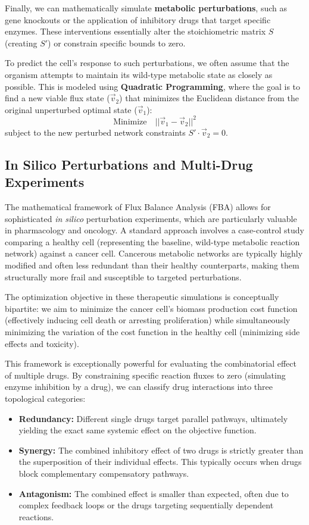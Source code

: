Finally, we can mathematically simulate \textbf{metabolic perturbations}, such as gene knockouts or the application of inhibitory drugs that target specific enzymes. These interventions essentially alter the stoichiometric matrix \(S\) (creating \(S'\)) or constrain specific bounds to zero.

To predict the cell's response to such perturbations, we often assume that the organism attempts to maintain its wild-type metabolic state as closely as possible. This is modeled using \textbf{Quadratic Programming}, where the goal is to find a new viable flux state (\(\vec{v}_2\)) that minimizes the Euclidean distance from the original unperturbed optimal state (\(\vec{v}_1\)):
\[
    \text{Minimize} \quad ||\vec{v}_1 - \vec{v}_2||^2
\]
subject to the new perturbed network constraints \(S' \cdot \vec{v}_2 = 0\).

\subsection{In Silico Perturbations and Multi-Drug Experiments}
\label{subsec:multidrug_insilico}

The mathematical framework of Flux Balance Analysis (FBA) allows for sophisticated \textit{in silico} perturbation experiments, which are particularly valuable in pharmacology and oncology. A standard approach involves a case-control study comparing a healthy cell (representing the baseline, wild-type metabolic reaction network) against a cancer cell. Cancerous metabolic networks are typically highly modified and often less redundant than their healthy counterparts, making them structurally more frail and susceptible to targeted perturbations.

The optimization objective in these therapeutic simulations is conceptually bipartite: we aim to minimize the cancer cell's biomass production cost function (effectively inducing cell death or arresting proliferation) while simultaneously minimizing the variation of the cost function in the healthy cell (minimizing side effects and toxicity).

This framework is exceptionally powerful for evaluating the combinatorial effect of multiple drugs. By constraining specific reaction fluxes to zero (simulating enzyme inhibition by a drug), we can classify drug interactions into three topological categories:
\begin{itemize}
    \item \textbf{Redundancy:} Different single drugs target parallel pathways, ultimately yielding the exact same systemic effect on the objective function.
    \item \textbf{Synergy:} The combined inhibitory effect of two drugs is strictly greater than the superposition of their individual effects. This typically occurs when drugs block complementary compensatory pathways.
    \item \textbf{Antagonism:} The combined effect is smaller than expected, often due to complex feedback loops or the drugs targeting sequentially dependent reactions.
\end{itemize}

